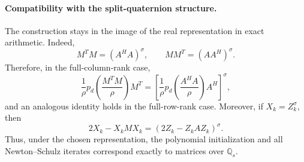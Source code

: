 \documentclass[12pt,a4paper]{article}
\theoremstyle{plain}
\theoremstyle{definition}
\theoremstyle{remark}
\begin{document}
\paragraph{Compatibility with the split-quaternion structure.}
The construction stays in the image of the real representation in exact arithmetic. Indeed,
\[
    M^TM=(A^HA)^\sigma, \qquad MM^T=(AA^H)^\sigma.
\]
Therefore, in the full-column-rank case,
\begin{equation} \label{eq:column-structure-poly}
    \frac{1}{\rho}p_d\!\left(\frac{M^TM}{\rho}\right)M^T = \left[ \frac{1}{\rho} p_d\!\left(\frac{A^HA}{\rho}\right)A^H \right]^\sigma,
\end{equation}
and an analogous identity holds in the full-row-rank case.  Moreover, if $X_k=Z_k^\sigma$, then
\[
    2X_k-X_kMX_k=(2Z_k-Z_kAZ_k)^\sigma.
\]
Thus, under the chosen representation, the polynomial initialization and all Newton--Schulz iterates correspond exactly to matrices over
\(\mathbb{Q}_s\).
\end{document}
